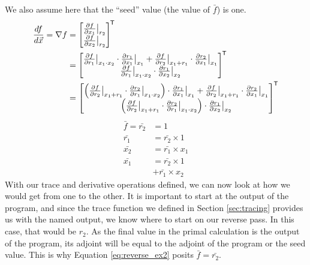     We also assume here that the ``seed'' value (the value of $\bar{f}$) is one.
    \begin{equation} \label{eq:reverse_ex}
        \begin{aligned}
            \frac{df}{d\vec{x}}=\nabla f&=\begin{bmatrix}
                \frac{\partial f}{\partial x_1}\bigr|_{r_2}\\
                \frac{\partial f}{\partial x_2}\bigr|_{r_2}
            \end{bmatrix}^{\mkern-1.5mu\mathsf{T}}\\
            &=\begin{bmatrix}
                \frac{\partial f}{\partial r_1}\bigr|_{x_1\cdot x_2}\cdot\frac{\partial r_1}{\partial x_1}\bigr|_{x_1}+\frac{\partial f}{\partial r_2}\bigr|_{x_1+r_1}\cdot\frac{\partial r_2}{\partial x_1}\bigr|_{x_1}\\
                \frac{\partial f}{\partial r_1}\bigr|_{x_1\cdot x_2}\cdot\frac{\partial r_1}{\partial x_2}\bigr|_{x_2}
            \end{bmatrix}^{\mkern-1.5mu\mathsf{T}}\\
            &=\begin{bmatrix}
                \left(\frac{\partial f}{\partial r_2}\bigr|_{x_1+r_1}\cdot\frac{\partial r_2}{\partial r_1}\bigr|_{x_1\cdot x_2}\right)\cdot\frac{\partial r_1}{\partial x_1}\bigr|_{x_1}+\frac{\partial f}{\partial r_2}\bigr|_{x_1+r_1}\cdot\frac{\partial r_2}{\partial x_1}\bigr|_{x_1}\\
                \left(\frac{\partial f}{\partial r_2}\bigr|_{x_1+r_1}\cdot\frac{\partial r_2}{\partial r_1}\bigr|_{x_1\cdot x_2}\right)\cdot\frac{\partial r_1}{\partial x_2}\bigr|_{x_2}
            \end{bmatrix}^{\mkern-1.5mu\mathsf{T}}
        \end{aligned}
    \end{equation}
    \begin{equation} \label{eq:reverse_ex2}
        \begin{aligned}
            \bar{f}=\bar{r_2}&=1\\
            \bar{r_1}&=\bar{r_2}\times1\\
            \bar{x_2}&=\bar{r_1}\times x_1\\
            \bar{x_1}&=\bar{r_2}\times1\\
            &+\bar{r_1}\times x_2
        \end{aligned}
    \end{equation}
    With our trace and derivative operations defined, we can now look at how we would get from one to the other.
    It is important to start at the output of the program, and since the trace function we defined in Section \ref{sec:tracing} provides us with the named output, we know where to start on our reverse pass.
    In this case, that would be $r_2$.
    As the final value in the primal calculation is the output of the program, its adjoint will be equal to the adjoint of the program or the seed value.
    This is why Equation \ref{eq:reverse_ex2} posits $\bar{f}=\bar{r_2}$.

